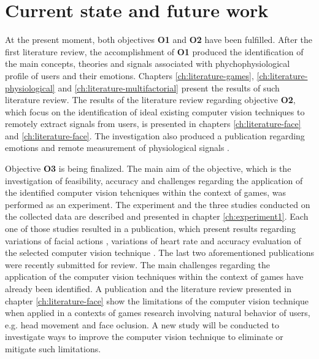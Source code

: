 
\section{Current state and future work}

At the present moment, both objectives \textbf{O1} and \textbf{O2} have been fulfilled. After the first literature review, the accomplishment of \textbf{O1} produced the identification of the main concepts, theories and signals associated with phychophysiological profile of users and their emotions. Chapters \ref{ch:literature-games}, \ref{ch:literature-physiological} and \ref{ch:literature-multifactorial} present the results of such literature review. The results of the literature review regarding objective \textbf{O2}, which focus on the identification of ideal existing computer vision techniques to remotely extract signals from users, is presented in chapters \ref{ch:literature-face} and \ref{ch:literature-face}. The investigation also produced a publication regarding emotions and remote measurement of physiological signals \parencite{bevilacqua2015proposal}.

Objective \textbf{O3} is being finalized. The main aim of the objective, which is the investigation of feasibility, accuracy and challenges regarding the application of the identified computer vision tehcniques within the context of games, was performed as an experiment. The experiment and the three studies conducted on the collected data are described and presented in chapter \ref{ch:experiment1}. Each one of those studies resulted in a publication, which present results regarding variations of facial actions \parencite{bevilacqua2016variations}, variations of heart rate \parencite{bevilacqua2017changes} and accuracy evaluation of the selected computer vision technique \parencite{bevilacqua2017accuracy}. The last two aforementioned publications were recently submitted for review. The main challenges regarding the application of the computer vision techniques within the context of games have already been identified. A publication \parencite{bevilacqua2017accuracy} and the literature review presented in chapter \ref{ch:literature-face} show the limitations of the computer vision technique when applied in a contexts of games research involving natural behavior of users, e.g. head movement and face oclusion. A new study will be conducted to investigate ways to improve the computer vision technique to eliminate or mitigate such limitations.

